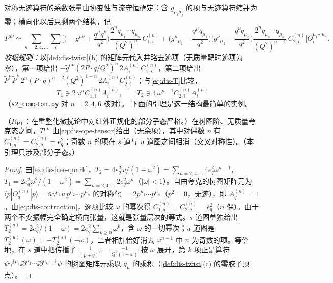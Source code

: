 对称无迹算符的系数张量由协变性与流守恒确定：含 $g_{\mu_i\mu_j}$ 的项与无迹算符缩并为零；横向化以后只剩两个结构，记
\begin{equation}\label{eq:dis-ope-tensor}
T^{\mu\nu}\simeq\sum_{n=2,4,\dots}\sum_i\Big[\Big(-g^{\mu\nu}+\frac{q^\mu q^\nu}{q^2}\Big)\frac{2^nq_{\mu_1}\cdots q_{\mu_n}}{(Q^2)^n}\,C^{(n)}_{1,i}
+\Big(g^\mu{}_{\mu_1}-\frac{q^\mu q_{\mu_1}}{q^2}\Big)\Big(g^\nu{}_{\mu_2}-\frac{q^\nu q_{\mu_2}}{q^2}\Big)\frac{2^nq_{\mu_3}\cdots q_{\mu_n}}{(Q^2)^{n-1}}\,C^{(n)}_{2,i}\Big]O_i^{\mu_1\cdots\mu_n}.
\end{equation}
\emph{收缩规则：}以\cref{def:dis-twist}(b) 的矩阵元代入并略去迹项（无质量靶时迹项为零），第一项给出 $-\tilde g^{\mu\nu}(2P\cdot q/Q^2)^n\,2A^{(n)}_iC^{(n)}_{1,i}$，第二项给出 $\tilde P^\mu\tilde P^\nu\,2^n(P\cdot q)^{n-2}(Q^2)^{1-n}\,2A^{(n)}_iC^{(n)}_{2,i}$；与\cref{eq:dis-T}比较，
\begin{equation}\label{eq:dis-contraction}
T_1\ni2\,\omega^nC^{(n)}_{1,i}A^{(n)}_i,\qquad T_2\ni4\,\omega^{n-1}C^{(n)}_{2,i}A^{(n)}_i
\end{equation}
（\texttt{s2\_compton.py} 对 $n=2,4,6$ 核对）。%
下面的引理是这一结构最简单的实例。

\begin{lemma}\label{lem:dis-tree-ope}
（$R_{\mathrm{PT}}$：在重整化微扰论中对红外正规化的部分子态严格。）在树图阶、无质量夸克态之间，$T^{\mu\nu}$ 由\cref{eq:dis-ope-tensor}给出（无余项），其中对偶数 $n$ 有 $C^{(n)}_{1,q}=C^{(n)}_{2,q}=e_q^2$；奇数 $n$ 的项在 $s$ 道与 $u$ 道图之间相消（交叉对称性）。（本引理只涉及部分子态。）
\end{lemma}

\begin{proof}
由\cref{ex:dis-free-quark}，$T_2=4e_q^2\omega/(1-\omega^2)=\sum_{n=2,4,\dots}4e_q^2\omega^{n-1}$，$T_1=2e_q^2\omega^2/(1-\omega^2)=\sum_{n=2,4,\dots}2e_q^2\omega^n$（$|\omega|<1$）。自由夸克的树图矩阵元为 $\langle p|O^{(n)}_q|p\rangle=\bar u\gamma^{\mu_1}u\,p^{\mu_2}\cdots p^{\mu_n}$ 的对称化 $=2p^{\mu_1}\cdots p^{\mu_n}$（$p^2=0$，无迹），即 $A^{(n)}_q=1$。由\cref{eq:dis-contraction}，逐项比较 $\omega$ 的幂次得 $C^{(n)}_{1,q}=C^{(n)}_{2,q}=e_q^2$（$n$ 偶）。由于两个不变振幅完全确定横向张量，这就是张量层次的等式。$s$ 道图单独给出 $T_2^{(s)}=2e_q^2/(1-\omega)=2e_q^2\sum_{k\ge0}\omega^k$，含 $\omega$ 的一切幂次；$u$ 道图是 $T_2^{(u)}(\omega)=-T_2^{(s)}(-\omega)$，二者相加恰好消去 $\omega^{n-1}$ 中 $n$ 为奇数的项。等价地，在 $s$ 道中把传播子 $\frac{1}{(p+q)^2}=\frac{-1}{Q^2(1-\omega)}$ 按 $\omega$ 展开，第 $k$ 项正是算符 $\bar\psi\gamma^{\{\mu_1}\ii\partial^{\mu_2}\cdots\ii\partial^{\mu_{k+1}\}}\psi$ 的树图矩阵元乘以 $q_{\mu}$ 的乘积（\cref{def:dis-twist}(c) 的零胶子顶点）。
\end{proof}

